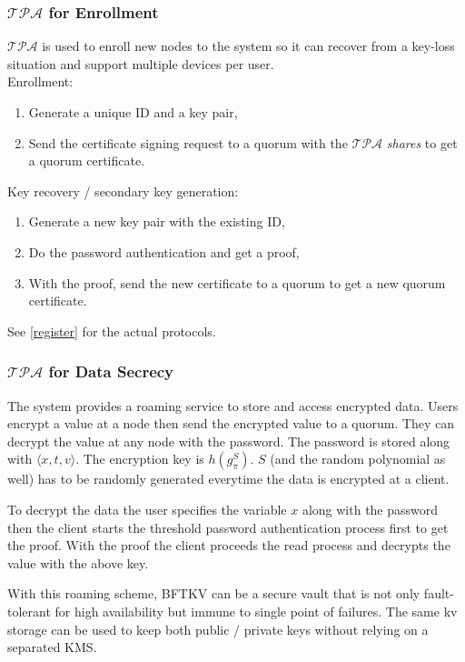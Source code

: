 \subsubsection*{$\mathcal{TPA}$ for Enrollment}
$\mathcal{TPA}$ is used to enroll new nodes to the system so it can
recover from a key-loss situation and support multiple devices per
user.\\

\noindent
Enrollment:
\begin{enumerate}
\item Generate a unique ID and a key pair,
\item Send the certificate signing request to a quorum with the
  $\mathcal{TPA}$ {\em shares} to get a quorum certificate.
\end{enumerate}

\noindent
Key recovery / secondary key generation:
\begin{enumerate}
\item Generate a new key pair with the existing ID,
\item Do the password authentication and get a proof,
\item With the proof, send the new certificate to a quorum to get a new
  quorum certificate.
\end{enumerate}
\ifdefined\ABSTRACT
\else
See \ref{register} for the actual protocols.
\fi

\subsubsection*{$\mathcal{TPA}$ for Data Secrecy}
The system provides a roaming service to store and access encrypted
data. Users encrypt a value at a node then send the encrypted value
to a quorum. They can decrypt the value at any node with the
password. The password is stored along with $\langle x, t, v \rangle$.
The encryption key is $h(g_{\pi}^S)$. $S$ (and the random polynomial
as well) has to be randomly generated everytime the data is encrypted
at a client.

To decrypt the data the user specifies the variable $x$ along with the
password then the client starts the threshold password authentication
process first to get the proof. With the proof the client proceeds the
{\sf read} process and decrypts the value with the above key.

With this roaming scheme, BFTKV can be a secure vault that is not only
fault-tolerant for high availability but immune to single point of
failures. The same kv storage can be used to keep both public / private
keys without relying on a separated KMS.

